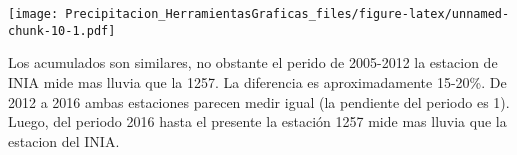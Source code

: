 \documentclass[]{article}
\newenvironment{Shaded}{\begin{snugshade}}{\end{snugshade}}
\newcommand{\DataTypeTok}[1]{\textcolor[rgb]{0.13,0.29,0.53}{#1}}
\newcommand{\DecValTok}[1]{\textcolor[rgb]{0.00,0.00,0.81}{#1}}
\newcommand{\KeywordTok}[1]{\textcolor[rgb]{0.13,0.29,0.53}{\textbf{#1}}}
\newcommand{\NormalTok}[1]{#1}
\newcommand{\StringTok}[1]{\textcolor[rgb]{0.31,0.60,0.02}{#1}}
\begin{document}
\begin{Shaded}
\end{Shaded}

\texttt{[image: Precipitacion\_HerramientasGraficas\_files/figure-latex/unnamed-chunk-10-1.pdf]}

Los acumulados son similares, no obstante el perido de 2005-2012 la
estacion de INIA mide mas lluvia que la 1257. La diferencia es
aproximadamente 15-20\%. De 2012 a 2016 ambas estaciones parecen medir
igual (la pendiente del periodo es 1). Luego, del periodo 2016 hasta el
presente la estación 1257 mide mas lluvia que la estacion del INIA.
\end{document}

